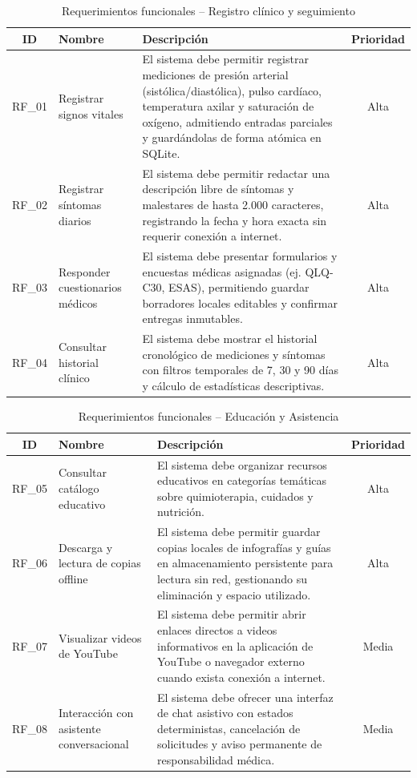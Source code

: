 \begin{table}[H]
\centering
\renewcommand{\arraystretch}{1.3}
\setlength{\tabcolsep}{6pt}
\begin{tabularx}{\textwidth}{|c|p{3.5cm}|X|c|}
\hline
\textbf{ID} & \textbf{Nombre} & \textbf{Descripción} & \textbf{Prioridad} \\ \hline
RF\_01 & Registrar signos vitales & El sistema debe permitir registrar mediciones de presión arterial (sistólica/diastólica), pulso cardíaco, temperatura axilar y saturación de oxígeno, admitiendo entradas parciales y guardándolas de forma atómica en SQLite. & Alta \\ \hline
RF\_02 & Registrar síntomas diarios & El sistema debe permitir redactar una descripción libre de síntomas y malestares de hasta 2.000 caracteres, registrando la fecha y hora exacta sin requerir conexión a internet. & Alta \\ \hline
RF\_03 & Responder cuestionarios médicos & El sistema debe presentar formularios y encuestas médicas asignadas (ej. QLQ-C30, ESAS), permitiendo guardar borradores locales editables y confirmar entregas inmutables. & Alta \\ \hline
RF\_04 & Consultar historial clínico & El sistema debe mostrar el historial cronológico de mediciones y síntomas con filtros temporales de 7, 30 y 90 días y cálculo de estadísticas descriptivas. & Alta \\ \hline
\end{tabularx}
\caption{Requerimientos funcionales – Registro clínico y seguimiento}
\label{tab:rf_clinico}
\end{table}

\begin{table}[H]
\centering
\renewcommand{\arraystretch}{1.3}
\setlength{\tabcolsep}{6pt}
\begin{tabularx}{\textwidth}{|c|p{3.5cm}|X|c|}
\hline
\textbf{ID} & \textbf{Nombre} & \textbf{Descripción} & \textbf{Prioridad} \\ \hline
RF\_05 & Consultar catálogo educativo & El sistema debe organizar recursos educativos en categorías temáticas sobre quimioterapia, cuidados y nutrición. & Alta \\ \hline
RF\_06 & Descarga y lectura de copias offline & El sistema debe permitir guardar copias locales de infografías y guías en almacenamiento persistente para lectura sin red, gestionando su eliminación y espacio utilizado. & Alta \\ \hline
RF\_07 & Visualizar videos de YouTube & El sistema debe permitir abrir enlaces directos a videos informativos en la aplicación de YouTube o navegador externo cuando exista conexión a internet. & Media \\ \hline
RF\_08 & Interacción con asistente conversacional & El sistema debe ofrecer una interfaz de chat asistivo con estados deterministas, cancelación de solicitudes y aviso permanente de responsabilidad médica. & Media \\ \hline
\end{tabularx}
\caption{Requerimientos funcionales – Educación y Asistencia}
\label{tab:rf_educacion}
\end{table}

